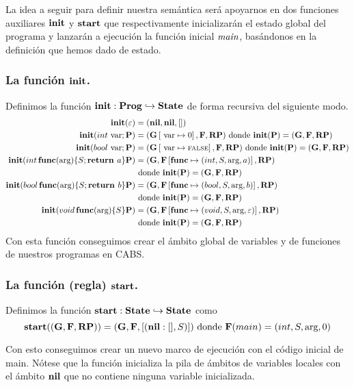 La idea a seguir para definir nuestra semántica será apoyarnos en dos funciones auxiliares $\textbf{init}$ y $\textbf{start}$ que respectivamente inicializarán el estado global del programa y lanzarán a ejecución la función inicial $\textit{main}$, basándonos en la definición que hemos dado de estado.

\subsubsection{La función $\textbf{init}$.}
Definimos la función $\textbf{init}: \textbf{Prog} \hookrightarrow \textbf{State}$ de forma recursiva del siguiente modo.
\begin{align*}
  \textbf{init}(\varepsilon) &= (\textbf{nil}, \textbf{nil}, [])\\
  \textbf{init}(int \text{ var} \mbox{;\,} \mathbf{P}) &= (\mathbf{G}\left[ \text{ var}\mapsto0 \right], \mathbf{F}, \textbf{RP}) \text{ donde } \textbf{init}(\mathbf{P}) = (\mathbf{G}, \mathbf{F}, \textbf{RP})\\
  \textbf{init}(bool \text{ var} \mbox{;\,} \mathbf{P}) &= (\mathbf{G}\left[ \text{ var}\mapsto\text{\scriptsize{FALSE}} \right], \mathbf{F}, \textbf{RP}) \text{ donde } \textbf{init}(\mathbf{P}) = (\mathbf{G}, \mathbf{F}, \textbf{RP})\\
  \textbf{init}(int \, \textbf{func}(\text{arg}) \{ S\mbox{;\,} \textbf{return } a\} \mathbf{P}) &= (\mathbf{G}, \mathbf{F}\left[ \textbf{func}\mapsto(int, S, \text{arg}, a) \right], \textbf{RP}) \\ &\text{ donde } \textbf{init}(\mathbf{P}) = (\mathbf{G}, \mathbf{F}, \textbf{RP})\\
  \textbf{init}(bool \, \textbf{func}(\text{arg}) \{ S\mbox{;\,} \textbf{return } b\} \mathbf{P}) &= (\mathbf{G}, \mathbf{F}\left[ \textbf{func}\mapsto(bool, S, \text{arg}, b) \right], \textbf{RP}) \\ &\text{ donde } \textbf{init}(\mathbf{P}) = (\mathbf{G}, \mathbf{F}, \textbf{RP})\\
  \textbf{init}(void \, \textbf{func}(\text{arg}) \{ S\} \mathbf{P}) &= (\mathbf{G}, \mathbf{F}\left[ \textbf{func}\mapsto(void, S, \text{arg}, \varepsilon) \right], \textbf{RP}) \\ &\text{ donde } \textbf{init}(\mathbf{P}) = (\mathbf{G}, \mathbf{F}, \textbf{RP})\\
\end{align*}
Con esta función conseguimos crear el ámbito global de variables y de funciones de nuestros programas en CABS.

\subsubsection{La función (regla) $\textbf{start}$.}
Definimos la función $\textbf{start}: \textbf{State} \hookrightarrow \textbf{State}$ como
$$
\textbf{start}((\mathbf{G}, \mathbf{F}, \textbf{RP})) = (\mathbf{G}, \mathbf{F}, [(\textbf{nil}:[], S)]) \text{ donde } \mathbf{F}(main) = (int, S, \text{arg}, 0)
$$

Con esto conseguimos crear un nuevo marco de ejecución con el código inicial de main. Nótese que la función inicializa la pila de ámbitos de variables locales con el ámbito $\textbf{nil}$ que no contiene ninguna variable inicializada.

